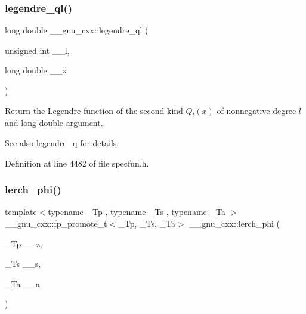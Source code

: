 \subsubsection{\texorpdfstring{legendre\+\_\+ql()}{legendre\_ql()}}
{\footnotesize\ttfamily long double \+\_\+\+\_\+gnu\+\_\+cxx\+::legendre\+\_\+ql (\begin{DoxyParamCaption}\item[{unsigned int}]{\+\_\+\+\_\+l,  }\item[{long double}]{\+\_\+\+\_\+x }\end{DoxyParamCaption})\hspace{0.3cm}{\ttfamily [inline]}}

Return the Legendre function of the second kind $ Q_l(x) $ of nonnegative degree $ l $ and {\ttfamily long double} argument.

\begin{DoxySeeAlso}{See also}
\hyperlink{group__gnu__math__spec__func_gadad5b22d0075dca31690907668af568f}{legendre\+\_\+q} for details. 
\end{DoxySeeAlso}


Definition at line 4482 of file specfun.\+h.

\mbox{\label{group__gnu__math__spec__func_ga31d7cfc601a99d72e58f654d0c890fd6}} 
\subsubsection{\texorpdfstring{lerch\+\_\+phi()}{lerch\_phi()}}
{\footnotesize\ttfamily template$<$typename \+\_\+\+Tp , typename \+\_\+\+Ts , typename \+\_\+\+Ta $>$ \\
\+\_\+\+\_\+gnu\+\_\+cxx\+::fp\+\_\+promote\+\_\+t$<$\+\_\+\+Tp, \+\_\+\+Ts, \+\_\+\+Ta$>$ \+\_\+\+\_\+gnu\+\_\+cxx\+::lerch\+\_\+phi (\begin{DoxyParamCaption}\item[{\+\_\+\+Tp}]{\+\_\+\+\_\+z,  }\item[{\+\_\+\+Ts}]{\+\_\+\+\_\+s,  }\item[{\+\_\+\+Ta}]{\+\_\+\+\_\+a }\end{DoxyParamCaption})\hspace{0.3cm}{\ttfamily [inline]}}

